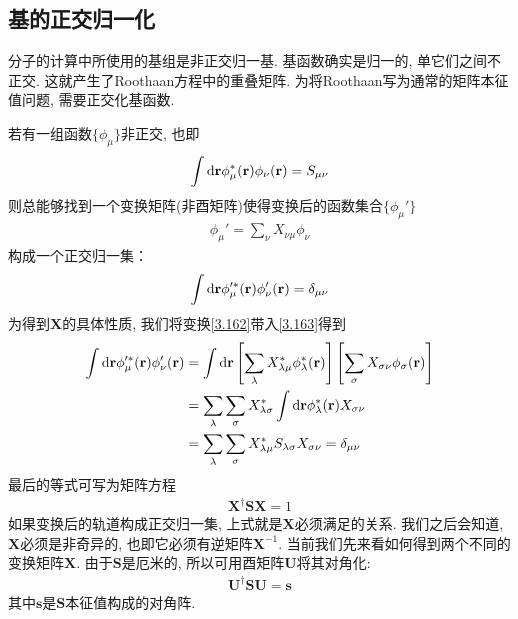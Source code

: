 \subsection{基的正交归一化}
分子的计算中所使用的基组是非正交归一基. 
基函数确实是归一的, 
单它们之间不正交. 
这就产生了Roothaan方程中的重叠矩阵. 
为将Roothaan写为通常的矩阵本征值问题, 
需要正交化基函数.


若有一组函数$\{\phi_\mu\}$非正交, 
也即
\begin{align}
	\int\dd{r}\phi_\mu^*(\bfr)\phi_\nu(\bfr) = S_{\mu\nu}
\end{align}
则总能够找到一个变换矩阵(非酉矩阵)使得变换后的函数集合$\{\phi_\mu'\}$
\begin{align}\label{3.162}
	\phi_\mu' = \sum_{\nu}X_{\nu\mu}\phi_\nu
\end{align}
构成一个正交归一集：
\begin{align}
	\label{3.163}
	\int\dd{r}\phi_\mu^{\prime*}(\bfr)\phi_\nu'(\bfr) = \delta_{\mu\nu}
\end{align}
为得到$\mathbf{X}$的具体性质, 
我们将变换\eqref{3.162}带入\eqref{3.163}得到
\begin{align}
	\int\dd{r}\phi_\mu^{\prime *}(\bfr)\phi_\nu^{\prime}(\bfr) & = \int\dd{r}\left[ \sum_{\lambda}X_{\lambda\mu}^*\phi_{\lambda}^*(\bfr)\right]\left[ \sum_\sigma X_{\sigma\nu}\phi_\sigma(\bfr) \right]\notag\\
	& = \sum_\lambda\sum_\sigma X_{\lambda\sigma}^*\int\dd{r}\phi_\lambda^*(\bfr)X_{\sigma\nu}\notag\\
	& = \sum_\lambda\sum_\sigma X_{\lambda\mu}^*S_{\lambda\sigma}X_{\sigma\nu} = \delta_{\mu\nu}
\end{align}
最后的等式可写为矩阵方程
\begin{align}\label{3.165}
	\mathbf{X^\dagger SX}=1
\end{align}
如果变换后的轨道构成正交归一集, 
上式就是$\mathbf{X}$必须满足的关系. 
我们之后会知道, 
$\mathbf{X}$必须是非奇异的, 
也即它必须有逆矩阵$\mathbf{X}^{-1}$. 
当前我们先来看如何得到两个不同的变换矩阵$\mathbf{X}$. 
由于$\mathbf{S}$是厄米的, 
所以可用酉矩阵$\mathbf{U}$将其对角化:
\begin{align}
	\mathbf{U^\dagger SU=s}
\end{align} 
其中$\mathbf{s}$是$\mathbf{S}$本征值构成的对角阵.


